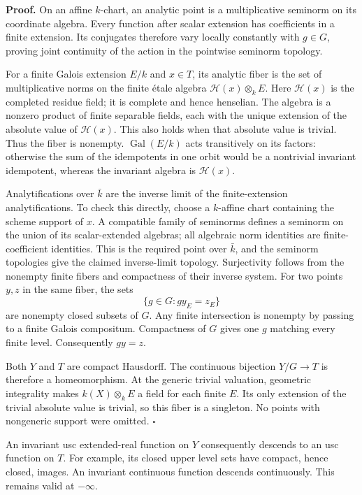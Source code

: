 \documentclass[
  11pt,
]{article}
\begin{document}
\textbf{Proof.} On an affine \(k\)-chart, an analytic point is a
multiplicative seminorm on its coordinate algebra. Every function after
scalar extension has coefficients in a finite extension. Its conjugates
therefore vary locally constantly with \(g\in G\), proving joint
continuity of the action in the pointwise seminorm topology.

For a finite Galois extension \(E/k\) and \(x\in T\), its analytic fiber
is the set of multiplicative norms on the finite étale algebra
\(\mathcal H(x)\otimes_k E\). Here \(\mathcal H(x)\) is the completed
residue field; it is complete and hence henselian. The algebra is a
nonzero product of finite separable fields, each with the unique
extension of the absolute value of \(\mathcal H(x)\). This also holds
when that absolute value is trivial. Thus the fiber is nonempty.
\(\operatorname{Gal}(E/k)\) acts transitively on its factors: otherwise
the sum of the idempotents in one orbit would be a nontrivial invariant
idempotent, whereas the invariant algebra is \(\mathcal H(x)\).

Analytifications over \(\bar k\) are the inverse limit of the
finite-extension analytifications. To check this directly, choose a
\(k\)-affine chart containing the scheme support of \(x\). A compatible
family of seminorms defines a seminorm on the union of its
scalar-extended algebras; all algebraic norm identities are
finite-coefficient identities. This is the required point over
\(\bar k\), and the seminorm topologies give the claimed inverse-limit
topology. Surjectivity follows from the nonempty finite fibers and
compactness of their inverse system. For two points \(y,z\) in the same
fiber, the sets \[
 \{g\in G:g y_E=z_E\}
\] are nonempty closed subsets of \(G\). Any finite intersection is
nonempty by passing to a finite Galois compositum. Compactness of \(G\)
gives one \(g\) matching every finite level. Consequently \(gy=z\).

Both \(Y\) and \(T\) are compact Hausdorff. The continuous bijection
\(Y/G\to T\) is therefore a homeomorphism. At the generic trivial
valuation, geometric integrality makes \(k(X)\otimes_k E\) a field for
each finite \(E\). Its only extension of the trivial absolute value is
trivial, so this fiber is a singleton. No points with nongeneric support
were omitted. \(\square\)

An invariant usc extended-real function on \(Y\) consequently descends
to an usc function on \(T\). For example, its closed upper level sets
have compact, hence closed, images. An invariant continuous function
descends continuously. This remains valid at \(-\infty\).
\end{document}

